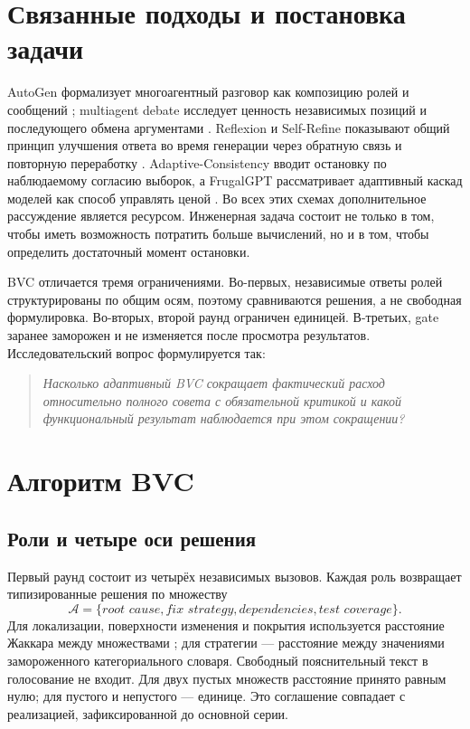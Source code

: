 \documentclass[11pt]{article}
\begin{document}
\section{Связанные подходы и постановка задачи}

AutoGen формализует многоагентный разговор как композицию ролей и сообщений
\cite{wu2023autogen}; multiagent debate исследует ценность независимых
позиций и последующего обмена аргументами \cite{du2023debate}. Reflexion и
Self-Refine показывают общий принцип улучшения ответа во время генерации через
обратную связь и повторную переработку
\cite{shinn2023reflexion,madaan2023selfrefine}. Adaptive-Consistency вводит
остановку по наблюдаемому согласию выборок, а FrugalGPT рассматривает
адаптивный каскад моделей как способ управлять ценой
\cite{aggarwal2023adaptive,chen2023frugalgpt}. Во всех этих схемах
дополнительное рассуждение является ресурсом. Инженерная задача состоит не
только в том, чтобы иметь возможность потратить больше вычислений, но и в том,
чтобы определить достаточный момент остановки.

BVC отличается тремя ограничениями. Во-первых, независимые ответы ролей
структурированы по общим осям, поэтому сравниваются решения, а не свободная
формулировка. Во-вторых, второй раунд ограничен единицей. В-третьих, gate
заранее заморожен и не изменяется после просмотра результатов. Исследовательский
вопрос формулируется так:

\begin{quote}
\emph{Насколько адаптивный BVC сокращает фактический расход относительно
полного совета с обязательной критикой и какой функциональный результат
наблюдается при этом сокращении?}
\end{quote}

\section{Алгоритм BVC}

\subsection{Роли и четыре оси решения}

Первый раунд состоит из четырёх независимых вызовов. Каждая роль возвращает
типизированные решения по множеству
\[
\mathcal{A}=
\{\textit{root cause},\textit{fix strategy},
  \textit{dependencies},\textit{test coverage}\}.
\]
Для локализации, поверхности изменения и покрытия используется расстояние
Жаккара между множествами \cite{kosub2019jaccard}; для стратегии --- расстояние между значениями
замороженного категориального словаря. Свободный пояснительный текст в
голосование не входит. Для двух пустых множеств расстояние принято равным нулю;
для пустого и непустого --- единице. Это соглашение совпадает с реализацией,
зафиксированной до основной серии.
\end{document}
